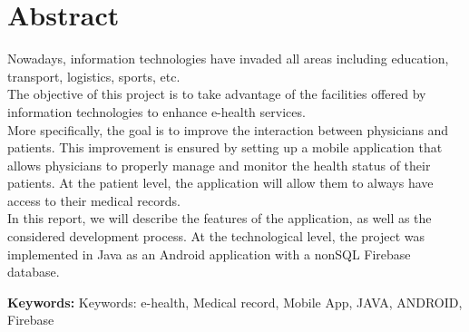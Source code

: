 \chapter*{Abstract}
{\large

Nowadays, information technologies have invaded all areas including education, transport, logistics, sports, etc. \\
The objective of this project is to take advantage of the facilities offered by information technologies to enhance e-health services. \\
More specifically, the goal is to improve the interaction between physicians and patients. This improvement is ensured by setting up
a mobile application that allows physicians to properly manage and monitor the health status of their patients. At the patient level, the application
will allow them to always have access to their medical records. \\

In this report, we will describe the features of the application, as well as the considered development process. At the technological level, the project was implemented in Java as an Android application with a nonSQL Firebase database.
}

\vspace{3cm}
{\large\textbf{Keywords:}}
Keywords: e-health, Medical record, Mobile App, JAVA, ANDROID, Firebase

